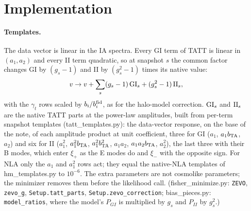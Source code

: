 \documentclass[11pt]{article}
\begin{document}
\section{Implementation}
\paragraph{Templates.}
The data vector is linear in the IA spectra. Every GI term of TATT is
linear in $(a_1, a_2)$ and every II term quadratic, so at snapshot $s$ the
common factor changes GI by $(g_s - 1)$ and II by $(g_s^2 - 1)$ times its
native value:
\begin{equation}
  v \to v + \sum_s (g_s - 1)\, {\rm GI}_s + (g_s^2 - 1)\, {\rm II}_s,
\end{equation}
with the $\gamma_t$ rows scaled by $b_i/b_i^{\rm fid}$, as for the
halo-model correction. ${\rm GI}_s$ and ${\rm II}_s$ are the native TATT
parts at the power-law amplitudes, built from per-term snapshot templates
(tatt\_templates.py): the data-vector response, on the base of the note, of
each amplitude product at unit coefficient, three for GI ($a_1$,
$a_1 b_{\rm TA}$, $a_2$) and six for II ($a_1^2$, $a_1^2 b_{\rm TA}$,
$a_1^2 b_{\rm TA}^2$, $a_1 a_2$, $a_1 a_2 b_{\rm TA}$, $a_2^2$), the last
three with their B modes, which enter $\xi_+$ as the E modes do and $\xi_-$
with the opposite sign. For NLA only the $a_1$ and $a_1^2$ rows act; they
equal the native-NLA templates of hm\_templates.py to $10^{-6}$. The extra parameters are not cosmolike parameters;
the minimizer removes them before the likelihood call.
(fisher\_minimize.py: \texttt{ZEVO}, \texttt{zevo\_g},
\texttt{Setup.tatt\_parts}, \texttt{Setup.zevo\_correction}; bias\_pieces.py:
\texttt{model\_ratios}, where the model's $P_{GI}$ is multiplied by $g_s$ and
$P_{II}$ by $g_s^2$.)
\end{document}
